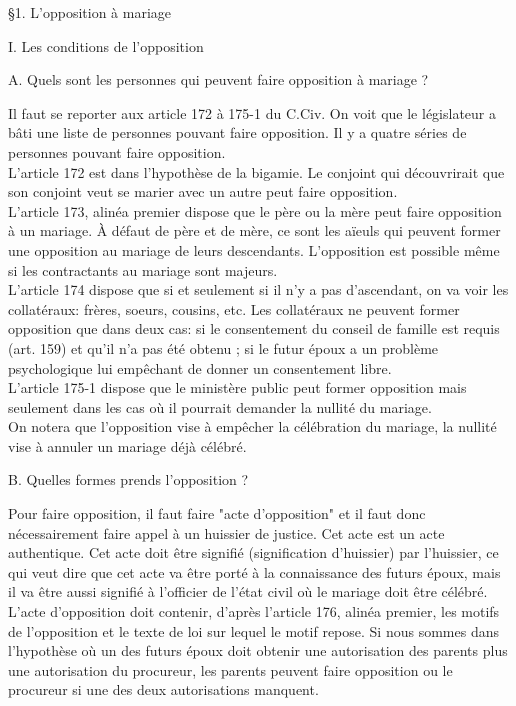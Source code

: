 \documentclass[12pt, a4paper, openany]{book}
\begin{document}
§1. L'opposition à mariage


I. Les conditions de l'opposition


A. Quels sont les personnes qui peuvent faire opposition à mariage ?


Il faut se reporter aux article 172 à 175-1 du C.Civ. On voit que le législateur a bâti une liste de personnes pouvant faire opposition. Il y a quatre séries de personnes pouvant faire opposition. \\ 
L'article 172 est dans l'hypothèse de la bigamie. Le conjoint qui découvrirait que son conjoint veut se marier avec un autre peut faire opposition. \\
L'article 173, alinéa premier dispose que le père ou la mère peut faire opposition à un mariage. À défaut de père et de mère, ce sont les aïeuls qui peuvent former une opposition au mariage de leurs descendants. L'opposition est possible même si les contractants au mariage sont majeurs. \\
L'article 174 dispose que si et seulement si il n'y a pas d'ascendant, on va voir les collatéraux: frères, soeurs, cousins, etc. Les collatéraux ne peuvent former opposition que dans deux cas: si le consentement du conseil de famille est requis (art. 159) et qu'il n'a pas été obtenu ; si le futur époux a un problème psychologique lui empêchant de donner un consentement libre. \\
L'article 175-1 dispose que le ministère public peut former opposition mais seulement dans les cas où il pourrait demander la nullité du mariage. \\
On notera que l'opposition vise à empêcher la célébration du mariage, la nullité vise à annuler un mariage déjà célébré. 


B. Quelles formes prends l'opposition ?


Pour faire opposition, il faut faire "acte d'opposition" et il faut donc nécessairement faire appel à un huissier de justice. Cet acte est un acte authentique. Cet acte doit être signifié (signification d'huissier) par l'huissier, ce qui veut dire que cet acte va être porté à la connaissance des futurs époux, mais il va être aussi signifié à l'officier de l'état civil où le mariage doit être célébré. \\
L'acte d'opposition doit contenir, d'après l'article 176, alinéa premier, les motifs de l'opposition et le texte de loi sur lequel le motif repose. Si nous sommes dans l'hypothèse où un des futurs époux doit obtenir une autorisation des parents plus une autorisation du procureur, les parents peuvent faire opposition ou le procureur si une des deux autorisations manquent.
\end{document}
